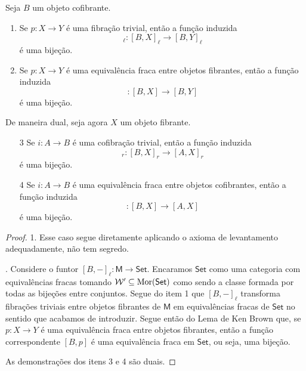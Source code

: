 \begin{prop}
  Seja $B$ um objeto cofibrante.
  \begin{enumerate}
  \item Se $p: X \to Y$ é uma fibração trivial, então a função induzida
    \begin{displaymath}
      [B,p]_{\ell}: [B,X]_{\ell} \to [B,Y]_{\ell}
    \end{displaymath}
    é uma bijeção.
    
  \item Se $p: X \to Y$ é uma equivalência fraca entre objetos fibrantes, então a função induzida
    \begin{displaymath}
      [B,p]: [B,X] \to [B,Y]
    \end{displaymath}
    é uma bijeção.
  \end{enumerate}

  De maneira dual, seja agora $X$ um objeto fibrante.
  \begin{enumerate}
  \item[3] Se $i: A \to B$ é uma cofibração trivial, então a função induzida
    \begin{displaymath}
      [i,X]_{r}: [B,X]_{r} \to [A,X]_{r}
    \end{displaymath}
    é uma bijeção.
    
  \item[4] Se $i: A \to B$ é uma equivalência fraca entre objetos cofibrantes, então a função induzida
    \begin{displaymath}
      [i,X]: [B,X] \to [A,X]
    \end{displaymath}
    é uma bijeção.
  \end{enumerate}
\end{prop}

\begin{proof}
  1. Esse caso segue diretamente aplicando o axioma de levantamento adequadamente, não tem segredo.

  . Considere o funtor $[B,-]_{\ell}: \mathsf{M} \to \mathsf{Set}$.
  Encaramos $\mathsf{Set}$ como uma categoria com equivalências fracas tomando $\mathcal{W}' \subseteq \mathrm{Mor}(\mathsf{Set})$ como sendo a classe formada por todas as bijeções entre conjuntos.
  Segue do item 1 que $[B,-]_{\ell}$ transforma fibrações triviais entre objetos fibrantes de $\mathsf{M}$ em equivalências fracas de $\mathsf{Set}$ no sentido que acabamos de introduzir.
  Segue então do Lema de Ken Brown que, se $p: X \to Y$ é uma equivalência fraca entre objetos fibrantes, então a função correspondente $[B,p]$ é uma equivalência fraca em $\mathsf{Set}$, ou seja, uma bijeção.

  \smallskip
  As demonstrações dos itens 3 e 4 são duais.
\end{proof}

